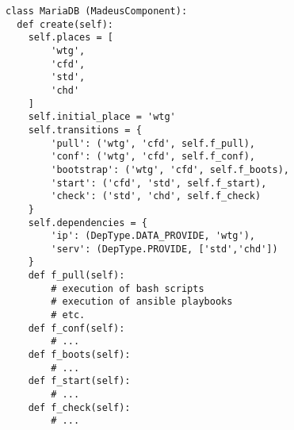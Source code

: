 \begin{lstlisting}[label=codemdb,caption=Madeus code of the MariaDB
  component type.]
class MariaDB (MadeusComponent):
  def create(self):
    self.places = [
        'wtg',
        'cfd',
        'std',
        'chd'
    ]
    self.initial_place = 'wtg'
    self.transitions = {
        'pull': ('wtg', 'cfd', self.f_pull),
        'conf': ('wtg', 'cfd', self.f_conf),
        'bootstrap': ('wtg', 'cfd', self.f_boots),
        'start': ('cfd', 'std', self.f_start),
        'check': ('std', 'chd', self.f_check)
    }
    self.dependencies = {
        'ip': (DepType.DATA_PROVIDE, 'wtg'),
        'serv': (DepType.PROVIDE, ['std','chd'])
    }
    def f_pull(self):
        # execution of bash scripts
        # execution of ansible playbooks
        # etc.
    def f_conf(self):
        # ...
    def f_boots(self):
        # ...
    def f_start(self):
        # ...
    def f_check(self):
        # ...
\end{lstlisting}
